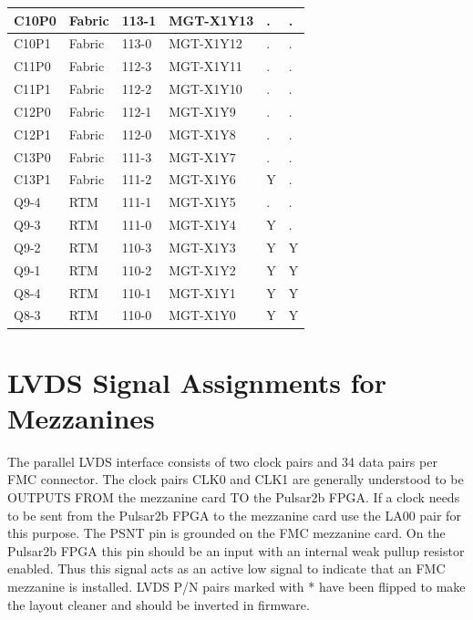 \documentclass[letterpaper]{article}
\begin{document}
\begin{table}[htp]
\begin{tabular}{|l|l|l|l|l|l|}
C10P0 & Fabric & 113-1 & MGT-X1Y13 & . & .\\ \hline
C10P1 & Fabric & 113-0 & MGT-X1Y12 & . & .\\ \hline
C11P0 & Fabric & 112-3 & MGT-X1Y11 & . & .\\ \hline
C11P1 & Fabric & 112-2 & MGT-X1Y10 & . & .\\ \hline
C12P0 & Fabric & 112-1 & MGT-X1Y9 & . & .\\ \hline
C12P1 & Fabric & 112-0 & MGT-X1Y8 & . & .\\ \hline
C13P0 & Fabric & 111-3 & MGT-X1Y7 & . & .\\ \hline
C13P1 & Fabric & 111-2 & MGT-X1Y6 & Y & .\\ \hline
Q9-4 & RTM & 111-1 & MGT-X1Y5 & . & .\\ \hline
Q9-3 & RTM & 111-0 & MGT-X1Y4 & Y & .\\ \hline
Q9-2 & RTM & 110-3 & MGT-X1Y3 & Y & Y\\ \hline
Q9-1 & RTM & 110-2 & MGT-X1Y2 & Y & Y\\ \hline
Q8-4 & RTM & 110-1 & MGT-X1Y1 & Y & Y\\ \hline
Q8-3 & RTM & 110-0 & MGT-X1Y0 & Y & Y\\ \hline
\end{tabular}
\end{table}

\newpage
\section{LVDS Signal Assignments for Mezzanines}
\label{Appendix_LVDS}

The parallel LVDS interface consists of two clock pairs and 34 data pairs per FMC connector.  The clock pairs CLK0 and CLK1 are generally understood to be OUTPUTS FROM the mezzanine card TO the Pulsar2b FPGA.  If a clock needs to be sent from the Pulsar2b FPGA to the mezzanine card use the LA00 pair for this purpose.  The PSNT pin is grounded on the FMC mezzanine card.  On the Pulsar2b FPGA this pin should be an input with an internal weak pullup resistor enabled.  Thus this signal acts as an active low signal to indicate that an FMC mezzanine is installed.  LVDS P/N pairs marked with * have been flipped to make the layout cleaner and should be inverted in firmware.
\end{document}
